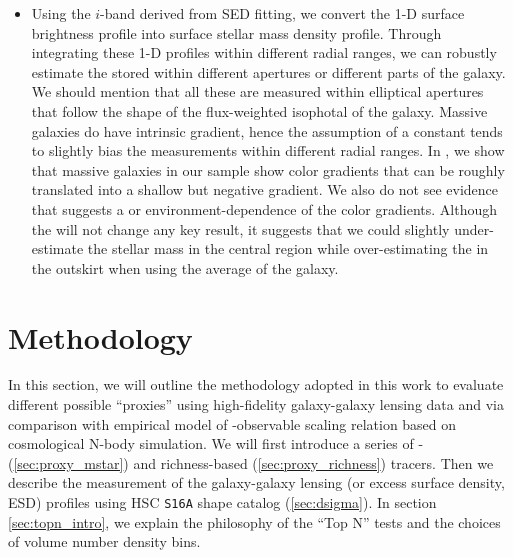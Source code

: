 \documentclass[a4paper,fleqn,usenatbib]{mnras}
\begin{document}
\begin{itemize}
		\item Using the $i$-band \mlratio{} derived from SED fitting, we convert the 
			1-D surface brightness profile into surface stellar mass density profile.
            Through integrating these 1-D profiles within different radial ranges, we 
            can robustly estimate the \mstar{} stored within different apertures or 
            different parts of the galaxy.
            We should mention that all these \mstar{} are measured within elliptical 
            apertures that follow the shape of the flux-weighted isophotal of the galaxy.
            Massive galaxies do have intrinsic \mlratio{} gradient, hence the assumption of 
            a constant \mlratio{} tends to slightly bias the \mstar{} measurements within 
            different radial ranges.
            In \citet{Huang2018b}, we show that massive galaxies in our sample show
            color gradients that can be roughly translated into a shallow but negative 
            \mlratio{} gradient. 
            We also do not see evidence that suggests a \mstar{} or environment-dependence 
            of the color gradients.
            Although the \mlratio{} will not change any key result, it suggests that we
            could slightly under-estimate the stellar mass in the central region while
            over-estimating the \mstar{} in the outskirt when using the average \mlratio{}
            of the galaxy.

	\end{itemize}


\section{Methodology}
    \label{sec:method}
    
    In this section, we will outline the methodology adopted in this work to evaluate different 
    possible \mvir{} ``proxies'' using high-fidelity galaxy-galaxy lensing data and via
    comparison with empirical model of \mvir{}-observable scaling relation based on cosmological 
    N-body simulation.
    We will first introduce a series of \mstar{}- (\ref{sec:proxy_mstar}) and richness-based 
    (\ref{sec:proxy_richness}) \mvir{} tracers.
    Then we describe the measurement of the galaxy-galaxy lensing \dsigma{} (or excess surface 
    density, ESD) profiles using HSC \texttt{S16A} shape catalog (\ref{sec:dsigma}).
    In section \ref{sec:topn_intro}, we explain the philosophy of the ``Top N'' tests and the 
    choices of volume number density bins.
\end{document}
